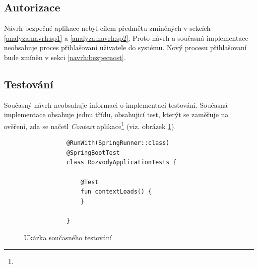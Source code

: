         \subsection{Autorizace}
            Návrh bezpečné aplikace nebyl cílem předmětu zmíněných v sekcích \ref{analyza:navrh:sp1} a \ref{analyza:navrh:sp2}. Proto návrh a současná implementace neobsahuje proces přihlašovaní uživatele do systému. Nový procesu přihlašovaní bude zmíněn v sekci \ref{navrh:bezpecnost}.
        
        \subsection{Testování}
            Současný návrh neobsahuje informaci o implementaci testování. Současná implementace obsahuje jednu třídu, obsahujicí test, kterýt se zaměřuje na ověření, zda se načetl {\textit{Context} aplikace}\footnote{} (viz. obrázek \ref{code:test-context-loads1}).
            \begin{figure}
            \begin{verbatim}
            @RunWith(SpringRunner::class)
            @SpringBootTest
            class RozvodyApplicationTests {

                @Test
                fun contextLoads() {
                }

            }
            \end{verbatim}
            \caption{Ukázka současného testování} 
            \label{code:test-context-loads1}
            \end{figure}